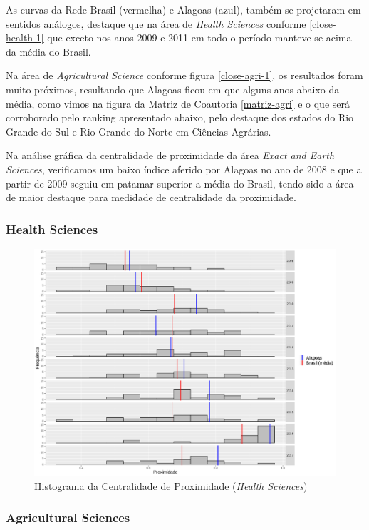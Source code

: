 As curvas da Rede Brasil (vermelha) e Alagoas (azul), também se projetaram em sentidos análogos, destaque que na área de \textit{Health Sciences} conforme \ref{close-health-1} que exceto nos anos 2009 e 2011 em todo o período manteve-se acima da média do Brasil. 

Na área de \textit{Agricultural Science} conforme figura \ref{close-agri-1}, os resultados foram muito próximos, resultando que Alagoas ficou em que alguns anos abaixo da média, como vimos na figura da Matriz de Coautoria \ref{matriz-agri} e o que será corroborado pelo ranking apresentado abaixo, pelo destaque dos estados do Rio Grande do Sul e Rio Grande do Norte em Ciências Agrárias.

Na análise gráfica da centralidade de proximidade da área \textit{Exact and Earth Sciences}, verificamos um baixo índice aferido por Alagoas no ano de 2008 e que a partir de 2009 seguiu em patamar superior a média do Brasil, tendo sido a área de maior destaque para medidade de centralidade da proximidade.


\subsubsection{Health Sciences}

\begin{figure}[H]
	\centering
	\includegraphics[scale=0.5]{Imagens/closeness-hist.pdf}
	\caption{Histograma da Centralidade de Proximidade (\textit{Health Sciences})}
	\label{hist-health-close-1}
\end{figure}

\subsubsection{Agricultural Sciences}

